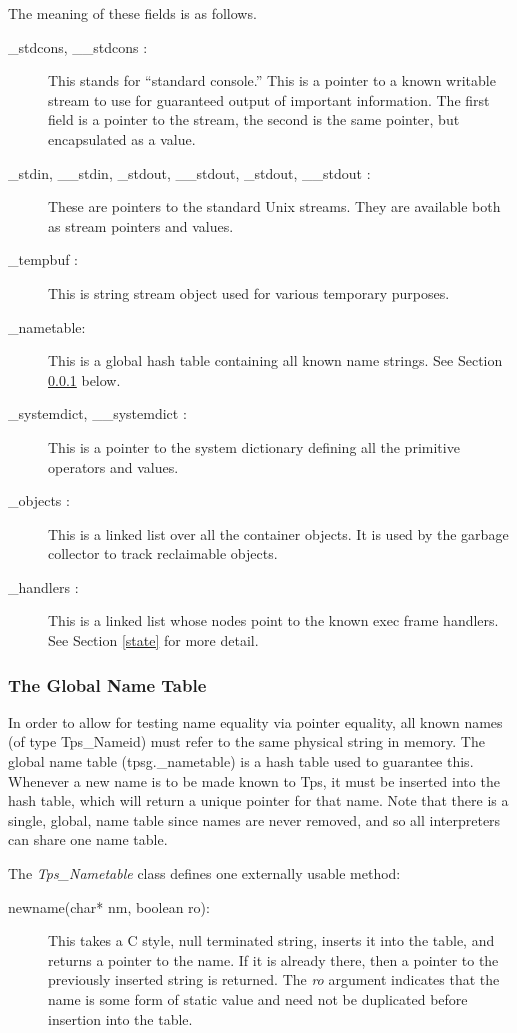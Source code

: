 The meaning of these fields is as follows.
\begin{description}
\item[\_stdcons, \_\_stdcons :]
This stands for ``standard console.''
This is a pointer to a known writable stream to use
for guaranteed output of important information.
The first field is a pointer to the stream, the second
is the same pointer, but encapsulated as a value.
\item[\_stdin, \_\_stdin, \_stdout, \_\_stdout, \_stdout, \_\_stdout :]
These are pointers to the standard Unix streams.
They are available both as stream pointers and values.
\item[\_tempbuf :]
This is string stream object used for various temporary purposes.
\item [\_nametable: ]
This is a global hash table containing all known name strings.
See Section \ref{nametable} below.
\item [\_systemdict, \_\_systemdict :]
This is a pointer to the system dictionary defining
all the primitive operators and values.
\item [\_objects :]
This is a linked list over all the container
objects.  It is used by the garbage collector
to track reclaimable objects.
\item [\_handlers :]
This is a linked list whose nodes point
to the known exec frame handlers.
See Section \ref{state} for more detail.
\end{description}

\subsubsection{The Global Name Table}
\label{nametable}
In order to allow for testing name equality via pointer
equality, all known names (of type Tps\_Nameid)
must refer to the same physical string in memory.
The global name table (tpsg.\_nametable) is a hash table
used to guarantee this.  Whenever a new name is
to be made known to Tps, it must be inserted into
the hash table, which will return a unique pointer for that name.
Note that there is a single, global, name table
since names are never removed, and so all interpreters
can share one name table.

The {\em Tps\_Nametable} class defines one externally usable method: 
\begin{description}
\item[newname(char* nm, boolean ro):]
This takes a C style, null terminated string, inserts it into the
table, and returns a pointer to the name.
If it is already there, then a pointer to the previously inserted
string is returned.
The {\em ro} argument indicates that the name is some form
of static value and need not be duplicated before
insertion into the table.
\end{description}

